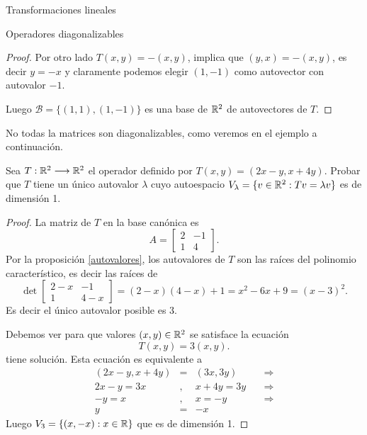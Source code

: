 \begin{chapter}{Transformaciones lineales}
\begin{section}{Operadores diagonalizables}
\begin{proof}
            Por otro lado $T(x,y) = -(x,y)$, implica  que $(y,x)            = -(x,y)$, es decir $y = -x$ y claramente podemos elegir $(1,-1)$ como autovector con autovalor $-1$.
            
            Luego $\mathcal{B} = \{(1,1),(1,-1) \}$  es una base de $\mathbb R^2$ de autovectores de  $T$.
        \end{proof}
        
        No todas la matrices son diagonalizables,  como veremos en el ejemplo a continuación. 
        
        
        \begin{ejemplo*}
            Sea $T:\mathbb R^2 \longrightarrow \mathbb R^2$ el operador definido por $T(x,y)=(2x-y,x+4y)$. Probar que $T$ tiene un único autovalor $\lambda$ cuyo autoespacio $V_\lambda=\{v\in \mathbb R^2: Tv=\lambda v\}$ es de dimensión 1.
        \end{ejemplo*}
        \begin{proof} La matriz de  $T$ en la base canónica es 
            $$
            A = \begin{bmatrix}
            2 & -1 \\ 1 & 4
            \end{bmatrix}. 
            $$
            Por la proposición \ref{autovalores}, los autovalores de $T$  son las raíces del polinomio característico,  es decir las raíces de 
            $$
            \det\left[\begin{matrix}
            2-x & -1 \\ 1 & 4-x
            \end{matrix} \right] = (2-x)(4-x)+1 = x^2 -6x + 9 = 
            (x -3)^2. 
            $$
            Es decir el  único autovalor posible es 3.
            
            Debemos ver para que valores  $(x,y)\in \mathbb R^2$ se satisface la ecuación
            $$
            T(x,y) = 3(x,y).
            $$
            tiene solución. Esta ecuación es equivalente a 
            \begin{equation*}
                \begin{array}{rcll}
                (2x-y,x+4y)&=&(3 x, 3 y)\quad &\Rightarrow \\
                2x-y = 3 x&,& x+4y = 3y \quad &\Rightarrow \\
                -y =  x&,& x = -y \quad &\Rightarrow \\
                y &=&  -x \quad &
                \end{array}
            \end{equation*}
            Luego $V_3 = \{(x,-x): x \in \mathbb R \}$ que es de dimensión 1.  	
            

\end{proof}
\end{section}
\end{chapter}
